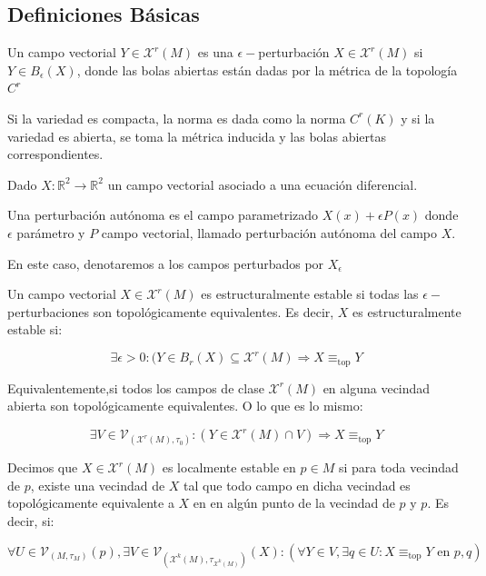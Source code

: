 \subsection{Definiciones Básicas}

\begin{defn}
	Un campo vectorial $Y \in \mathcal{X}^r(M)$ es una $\epsilon-$perturbación $X \in \mathcal{X}^r(M)$ si $Y \in B_\epsilon(X)$, donde las bolas abiertas están dadas por la métrica de la topología $C^r$
\end{defn}

\begin{rmrk}
	Si la variedad es compacta, la norma es dada como la norma $C^r(K)$ y si la variedad es abierta, se toma la métrica inducida y las bolas abiertas correspondientes.
\end{rmrk}

\begin{defn}
	Dado $X:\mathbb{R}^2 \to \mathbb{R}^2$ un campo vectorial asociado a una ecuación diferencial.
	
	Una perturbación autónoma es el campo parametrizado $X(x) + \epsilon P(x)$ donde $\epsilon$ parámetro y $P$ campo vectorial, llamado perturbación autónoma del campo $X$.
	
	En este caso, denotaremos a los campos  perturbados por $X_\epsilon$
\end{defn}

\begin{defn}
	Un campo vectorial $X\in \mathcal{X}^r(M)$ es estructuralmente estable si todas las $\epsilon-$perturbaciones son topológicamente equivalentes. Es decir, $X$ es estructuralmente estable si:
	
	\begin{equation*}
		\exists\epsilon>0: (Y\in B_r(X)\subseteq \mathcal{X}^r(M) \Rightarrow  X\equiv_{\text{top}} Y
	\end{equation*}
	
	Equivalentemente,si todos los campos de clase $\mathcal{X}^r(M)$ en alguna vecindad abierta son topológicamente equivalentes.  O lo que es lo mismo:
	
	\begin{equation*}
		\exists V \in \mathcal{V}_{(\mathcal{X}^r(M), \tau_0)}: (Y\in \mathcal{X}^r(M)\cap V) \Rightarrow  X\equiv_{\text{top}} Y
	\end{equation*}
\end{defn}


\begin{defn}
	Decimos que $X\in \mathcal{X}^r(M)$ es localmente estable en $p \in M$ si para toda vecindad de $p$, existe una vecindad de $X$ tal que todo campo  en dicha vecindad es topológicamente equivalente a $X$ en en algún punto de la vecindad de $p$ y $p$. Es decir, si:
	
	\begin{equation*}
		\forall U \in \mathcal{V}_{(M,\tau_M)}(p) , \exists V \in \mathcal{V}_{(\mathcal{X}^k(M),\tau_{\mathcal{X}^k(M)})}(X) : (\forall Y \in V, \exists q \in U:   X\equiv_{\text{top}} Y \text{ en } p , q ) 
	\end{equation*}
\end{defn}

